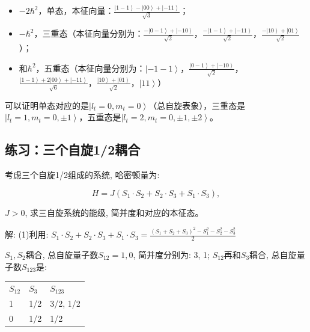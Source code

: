 \begin{itemize}
  \item $-2\hbar^2$，单态，本征向量：$\frac{{\left| {1 - 1} \right\rangle  -
\left| {00} \right\rangle  + \left| { - 11} \right\rangle }}{{\sqrt
3 }}$；

  \item $-\hbar^2$，三重态（本征向量分别为：$\frac{{ - \left| {0 - 1}
\right\rangle  + \left| { - 10} \right\rangle }}{{\sqrt 2
}}$，$\frac{{ - \left| {1 - 1} \right\rangle  + \left| { - 11}
\right\rangle }}{{\sqrt 2 }}$，$\frac{{ - \left| {10} \right\rangle
+ \left| {01} \right\rangle }}{{\sqrt 2 }}$）；

  \item 和$\hbar^2$，五重态（本征向量分别为：$\left| { - 1 - 1}
\right\rangle$，$\frac{{\left| {0 - 1} \right\rangle  + \left| { -
10} \right\rangle }}{{\sqrt 2 }}$，$\frac{{\left| {1 - 1}
\right\rangle  + 2\left| {00} \right\rangle  + \left| { - 11}
\right\rangle }}{{\sqrt 6 }}$，$\frac{{\left| {10} \right\rangle  +
\left| {01} \right\rangle }}{{\sqrt 2 }}$，$\left| {11}
\right\rangle$）

\end{itemize}


可以证明单态对应的是$\left| {l_t  = 0,m_t  = 0}
\right\rangle$（总自旋表象），三重态是$\left| {l_t  = 1,m_t  = 0,
\pm 1} \right\rangle$，五重态是$\left| {l_t  = 2,m_t  = 0, \pm 1,
\pm 2} \right\rangle$。


\subsection*{练习：三个自旋1/2耦合}

考虑三个自旋1/2组成的系统, 哈密顿量为:

\begin{equation*}
H=J(S_1 \cdot S_2 + S_2 \cdot S_3 + S_1 \cdot S_3),
\end{equation*}

$J>0$, 求三自旋系统的能级, 简并度和对应的本征态。

解: (1)利用: $S_1  \cdot S_2  + S_2  \cdot S_3  + S_1  \cdot S_3  =
\frac{{\left( {S_1  + S_2  + S_3 } \right)^2  - S_1^2  - S_2^2  -
S_3^2 }} {2}$

$S_1, S_2$耦合, 总自旋量子数$S_{12}=1, 0$, 简并度分别为: 3, 1;
$S_{12}$再和$S_3$耦合, 总自旋量子数$S_{123}$是:

\begin{center}
\begin{tabular}{|l|l|l|}
  \hline
  $S_{12}$ & $S_3$ & $S_{123}$ \\
  1 & 1/2 & 3/2, 1/2 \\
  0 & 1/2 & 1/2 \\
  \hline
\end{tabular}
\end{center}

